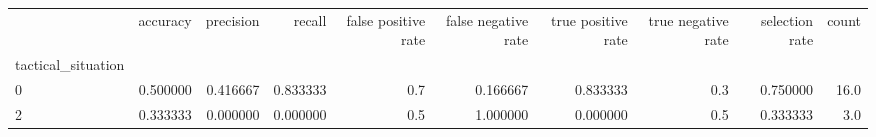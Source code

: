 \begin{tabular}{lrrrrrrrrr}
\toprule
{} &  accuracy &  precision &    recall &  false positive rate &  false negative rate &  true positive rate &  true negative rate &  selection rate &  count \\
tactical\_situation &           &            &           &                      &                      &                     &                     &                 &        \\
\midrule
0                  &  0.500000 &   0.416667 &  0.833333 &                  0.7 &             0.166667 &            0.833333 &                 0.3 &        0.750000 &   16.0 \\
2                  &  0.333333 &   0.000000 &  0.000000 &                  0.5 &             1.000000 &            0.000000 &                 0.5 &        0.333333 &    3.0 \\
\bottomrule
\end{tabular}
